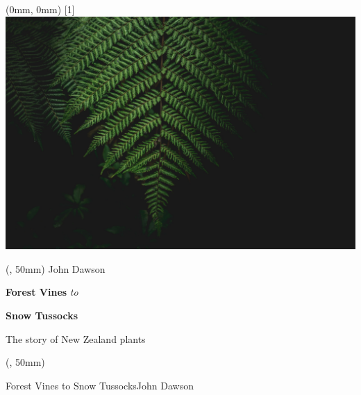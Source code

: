 \documentclass{article}
\newlength{\authoroffset}
\newlength{\titlewidth}
\newlength{\spineoffset}
\begin{document}
	\color{white}%
	\sffamily%
	\begin{textblock*}{\paperwidth} (0mm, 0mm)
		\scalebox{-1}[1]{\includegraphics[height=1.0\paperheight, keepaspectratio]{graphics/racim-amr-9uKUR7TwNpU-unsplash.jpg}}
	\end{textblock*}

	\begin{textblock*}{\titlewidth} (\authoroffset, 50mm) %
		\fontsize{28}{33}\selectfont%
		John Dawson\par
		\vspace{14em}%
		\raggedleft%
		\fontsize{44}{52}\selectfont%
		\textbf{Forest Vines}\emph{ to}\par
		\textbf{Snow Tussocks}\par
		\vspace{0.5em}
		\fontsize{28}{33}\selectfont%
		The story of New Zealand plants
	\end{textblock*}

	\begin{textblock*}{1pt} (\spineoffset-9pt, 50mm)
		\centering%
		\begin{rotate}{-90}
			\fontsize{22}{22}\selectfont%
			Forest Vines to Snow Tussocks\hspace{8em}John Dawson
		\end{rotate}
	\end{textblock*}
\end{document}
